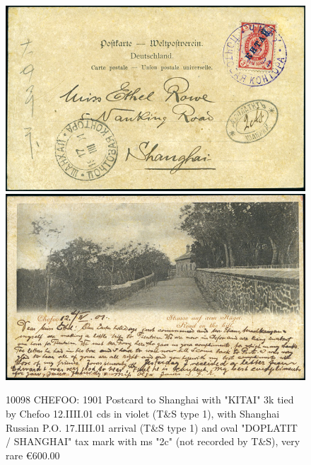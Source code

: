 \begin{figure}[htbp]
\centering
\includegraphics[width=.95\textwidth]{../russian-post-offices-in-china/10098.jpg}
\includegraphics[width=.95\textwidth]{../russian-post-offices-in-china/10098-1.jpg}
\caption{
10098	CHEFOO: 1901 Postcard to Shanghai with "KITAI" 3k tied by Chefoo 
12.IIII.01 cds in violet (T\&S type 1), with Shanghai Russian 
P.O. 17.IIII.01 arrival (T\&S type 1) and oval "DOPLATIT / SHANGHAI" 
tax mark with ms "2c" (not recorded by T\&S), very rare
\euro 600.00 
}  
\end{figure} 

